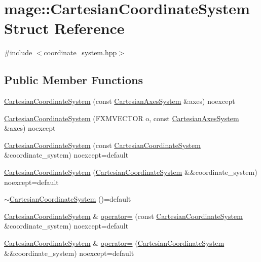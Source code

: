 \hypertarget{structmage_1_1_cartesian_coordinate_system}{}\section{mage\+:\+:Cartesian\+Coordinate\+System Struct Reference}
\label{structmage_1_1_cartesian_coordinate_system}


{\ttfamily \#include $<$coordinate\+\_\+system.\+hpp$>$}

\subsection*{Public Member Functions}
\begin{DoxyCompactItemize}
\item 
\hyperlink{structmage_1_1_cartesian_coordinate_system_a1cc660de888515c85f427a57f488dd5a}{Cartesian\+Coordinate\+System} (const \hyperlink{structmage_1_1_cartesian_axes_system}{Cartesian\+Axes\+System} \&axes) noexcept
\item 
\hyperlink{structmage_1_1_cartesian_coordinate_system_a0ee3d1c8cddf4eee1cebef32b2112a53}{Cartesian\+Coordinate\+System} (F\+X\+M\+V\+E\+C\+T\+OR o, const \hyperlink{structmage_1_1_cartesian_axes_system}{Cartesian\+Axes\+System} \&axes) noexcept
\item 
\hyperlink{structmage_1_1_cartesian_coordinate_system_a5ea6826b1cebf8455e3d25d2f5b8f2ba}{Cartesian\+Coordinate\+System} (const \hyperlink{structmage_1_1_cartesian_coordinate_system}{Cartesian\+Coordinate\+System} \&coordinate\+\_\+system) noexcept=default
\item 
\hyperlink{structmage_1_1_cartesian_coordinate_system_a5197e6a2023f44d96bede3e03f7a72c9}{Cartesian\+Coordinate\+System} (\hyperlink{structmage_1_1_cartesian_coordinate_system}{Cartesian\+Coordinate\+System} \&\&coordinate\+\_\+system) noexcept=default
\item 
\hyperlink{structmage_1_1_cartesian_coordinate_system_a86effcef63e455323c194063c0f1fd46}{$\sim$\+Cartesian\+Coordinate\+System} ()=default
\item 
\hyperlink{structmage_1_1_cartesian_coordinate_system}{Cartesian\+Coordinate\+System} \& \hyperlink{structmage_1_1_cartesian_coordinate_system_ab7c682092e8d022b2b78ecfb5238d5fa}{operator=} (const \hyperlink{structmage_1_1_cartesian_coordinate_system}{Cartesian\+Coordinate\+System} \&coordinate\+\_\+system) noexcept=default
\item 
\hyperlink{structmage_1_1_cartesian_coordinate_system}{Cartesian\+Coordinate\+System} \& \hyperlink{structmage_1_1_cartesian_coordinate_system_ab435fab99df68ab3a91240900508bfcd}{operator=} (\hyperlink{structmage_1_1_cartesian_coordinate_system}{Cartesian\+Coordinate\+System} \&\&coordinate\+\_\+system) noexcept=default

\end{DoxyCompactItemize}
